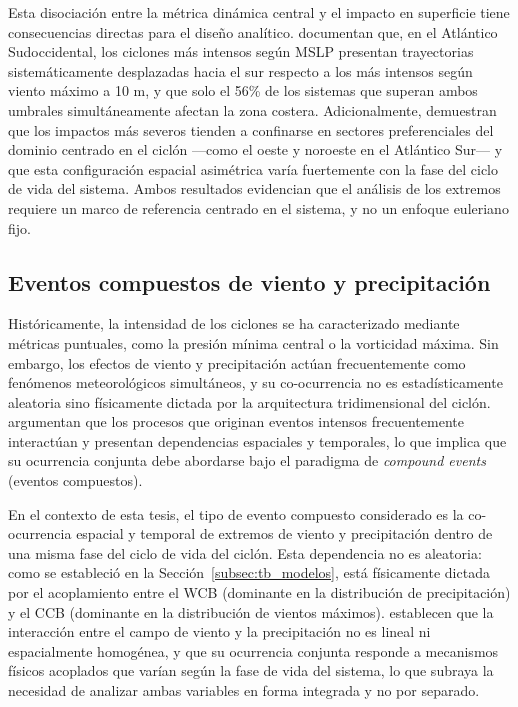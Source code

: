 Esta disociación entre la métrica dinámica central y el impacto en superficie tiene consecuencias directas para el diseño analítico. \citet{andrade2024composite} documentan que, en el Atlántico Sudoccidental, los ciclones más intensos según MSLP presentan trayectorias sistemáticamente desplazadas hacia el sur respecto a los más intensos según viento máximo a 10 m, y que solo el 56\% de los sistemas que superan ambos umbrales simultáneamente afectan la zona costera. Adicionalmente, \citet{gramcianinov2023impact} demuestran que los impactos más severos tienden a confinarse en sectores preferenciales del dominio centrado en el ciclón —como el oeste y noroeste en el Atlántico Sur— y que esta configuración espacial asimétrica varía fuertemente con la fase del ciclo de vida del sistema. Ambos resultados evidencian que el análisis de los extremos requiere un marco de referencia centrado en el sistema, y no un enfoque euleriano fijo.

\subsection{Eventos compuestos de viento y precipitación}\label{subsec:tb_compound_def}

Históricamente, la intensidad de los ciclones se ha caracterizado mediante métricas puntuales, como la presión mínima central o la vorticidad máxima. Sin embargo, los efectos de viento y precipitación actúan frecuentemente como fenómenos meteorológicos simultáneos, y su co-ocurrencia no es estadísticamente aleatoria sino físicamente dictada por la arquitectura tridimensional del ciclón. \citet{zscheischler2018future} argumentan que los procesos que originan eventos intensos frecuentemente interactúan y presentan dependencias espaciales y temporales, lo que implica que su ocurrencia conjunta debe abordarse bajo el paradigma de \textit{compound events} (eventos compuestos).

En el contexto de esta tesis, el tipo de evento compuesto considerado es la co-ocurrencia espacial y temporal de extremos de viento y precipitación dentro de una misma fase del ciclo de vida del ciclón. Esta dependencia no es aleatoria: como se estableció en la Sección~\ref{subsec:tb_modelos}, está físicamente dictada por el acoplamiento entre el WCB (dominante en la distribución de precipitación) y el CCB (dominante en la distribución de vientos máximos). \citet{chen2025characteristics} establecen que la interacción entre el campo de viento y la precipitación no es lineal ni espacialmente homogénea, y que su ocurrencia conjunta responde a mecanismos físicos acoplados que varían según la fase de vida del sistema, lo que subraya la necesidad de analizar ambas variables en forma integrada y no por separado.

